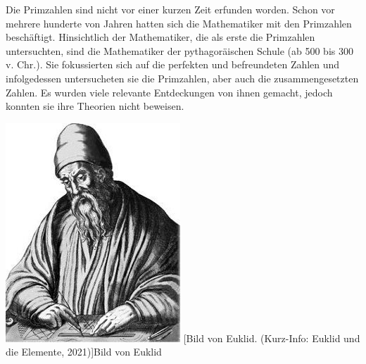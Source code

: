 \begin{minipage}{0.65\linewidth}
Die Primzahlen sind nicht vor einer kurzen Zeit erfunden
worden. Schon vor mehrere hunderte von Jahren hatten sich
die Mathematiker mit den Primzahlen beschäftigt.
Hinsichtlich der Mathematiker, die als erste die Primzahlen
untersuchten, sind die Mathematiker der pythagoräischen
Schule (ab 500 bis 300 v. Chr.). Sie fokussierten sich auf
die perfekten und befreundeten Zahlen und infolgedessen
untersucheten sie die Primzahlen, aber auch die
zusammengesetzten Zahlen. Es wurden viele relevante
Entdeckungen von ihnen gemacht, jedoch konnten sie ihre
Theorien nicht beweisen.
\end{minipage}
\hfil
\begin{minipage}[r]{0.3\linewidth}
  \captionsetup{type=figure,font=small,skip=6pt,format=plain}%
  \capstart
  \includegraphics[width=1.0\linewidth]{./images/euklid.jpg}
  [Bild von Euklid. (Kurz-Info: Euklid und die Elemente,
2021)]{Bild von Euklid}
  \label{fig:portrait_euklid}
\end{minipage}
\vspace{.3cm}

